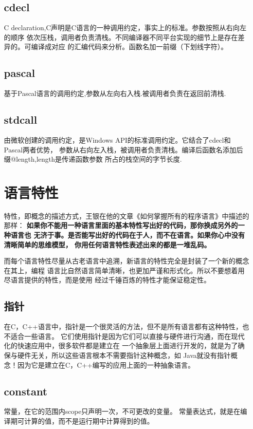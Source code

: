 \subsection{cdecl}
C declaration,C声明是C语言的一种调用约定，事实上的标准。参数按照从右向左的顺序
依次压栈，调用者负责清栈。不同编译器不同平台实现的细节上是存在差异的。可编译成对应
的汇编代码来分析。函数名加一前缀（下划线字符）。

\subsection{pascal}
基于Pascal语言的调用约定,参数从左向右入栈.被调用者负责在返回前清栈.

\subsection{stdcall}
由微软创建的调用约定，是Windows API的标准调用约定。它结合了cdecl和Pascal两者优势，
参数从右向左入栈，被调用者负责清栈。编译后函数名添加后缀@length,length是传递函数参数
所占的栈空间的字节长度.

\section{语言特性}
特性，即概念的描述方式，王银在他的文章《如何掌握所有的程序语言》中描述的那样：
\textbf{如果你不能用一种语言里面的基本特性写出好的代码，那你换成另外的一种语言也
无济于事。是否能写出好的代码在于人，而不在语言。如果你心中没有清晰简单的思维模型，
你用任何语言特性表述出来的都是一堆乱码。}

而每个语言特性尽量从古老语言中追溯，新语言的特性完全是封装了一个新的概念在其上，编程
语言比自然语言简单清晰，也更加严谨和形式化。所以不要想着用尽语言提供的特性，而是使用
经过千锤百炼的特性才能保证稳定性。

\subsection{指针}
在C，C++语言中，指针是一个很灵活的方法，但不是所有语言都有这种特性，也不适合一些语言。
它们使用指针是因为它们可以直接与硬件进行沟通，而在现代化的快速应用中，很多软件都是建立在
一个抽象层上面进行开发的，就是为了确保与硬件无关，所以这些语言根本不需要指针这种概念，如
Java就没有指针概念！因为它是建立在C，C++编写的应用上面的一种抽象语言。

\subsection{constant}
常量，在它的范围内scope只声明一次，不可更改的变量。
常量表达式，就是在编译期可计算的值，而不是运行期中计算得到的值。

